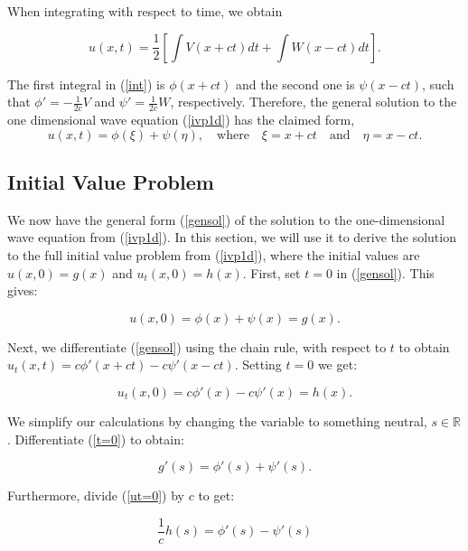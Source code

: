 \documentclass[a4paper, 12pt]{article}
\numberwithin{equation}{section}
\begin{document}
When integrating with respect to time, we obtain

\begin{equation} \label{int}
    u(x,t)=\frac{1}{2}\left[\int{V(x+ct)dt}+\int{W(x-ct)dt}\right].
\end{equation}

The first integral in (\ref{int}) is $\phi(x+ct)$ and the second one is
$\psi(x-ct)$, such that $\phi'=-\frac{1}{2c}V$ and $\psi'=\frac{1}{2c}W$,
respectively. Therefore, the general solution to the one dimensional wave
equation (\ref{ivp1d}) has the claimed form, 
\begin{equation} \label{gensol}
    u(x, t)=\phi(\xi)+\psi(\eta), \quad \textrm{where} \quad \xi=x+ct \quad \textrm{and} \quad \eta=x-ct.
\end{equation}

\subsection{Initial Value Problem}
We now have the general form (\ref{gensol}) of the solution to the
one-dimensional wave equation from (\ref{ivp1d}). In this section, we will use
it to derive the solution to the full initial value problem from (\ref{ivp1d}),
where the initial values are $u(x,0)=g(x)$ and $u_t(x,0)=h(x)$. First, set $t=0$
in (\ref{gensol}). This gives:

\begin{equation} \label{t=0}
    u(x,0)=\phi(x)+\psi(x)=g(x).
\end{equation}

Next, we differentiate (\ref{gensol}) using the chain rule, with respect to $t$
to obtain $u_t(x,t)=c\phi'(x+ct)-c\psi'(x-ct)$. Setting $t=0$ we get:

\begin{equation} \label{ut=0}
    u_t(x,0)=c\phi'(x)-c\psi'(x)=h(x).
\end{equation}

We simplify our calculations by changing the variable to something neutral, $s
\in \mathbb{R}$. Differentiate (\ref{t=0}) to obtain:

\begin{equation} \label{eqq9}
    g'(s)=\phi'(s)+\psi'(s).
\end{equation}

Furthermore, divide (\ref{ut=0}) by $c$ to get:

\begin{equation} \label{eqq10}
    \frac{1}{c}h(s)=\phi'(s)-\psi'(s)
\end{equation}
\end{document}
